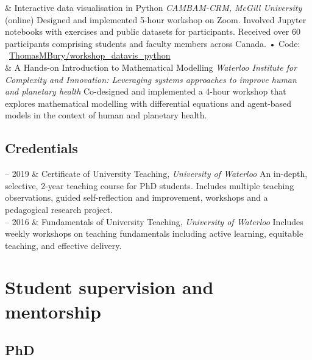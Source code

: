 \documentclass[11pt, a4paper]{article}
\newcommand{\GitHub}[1]{\newline • Code: \faGithub\ \href{https://github.com/#1}{#1}}
\newcommand{\Duration}[2]{\fontsize{10pt}{0}\selectfont #1 -- #2}
\newcommand{\Year}[1]{\fontsize{10pt}{0}\selectfont #1}
\begin{document}
\begin{EntriesTable}
\Year{2020} &
  Interactive data visualisation in Python\newline
  \textit{CAMBAM-CRM, McGill University} (online) \newline
  Designed and implemented 5-hour workshop on Zoom. 
  Involved Jupyter notebooks with exercises and public datasets for participants. 
  Received over 60 participants comprising students and faculty members across Canada.
  \GitHub{ThomasMBury/workshop\_datavis\_python}
  \\
\Year{2018}  &
  A Hands-on Introduction to Mathematical Modelling\newline
  \textit{Waterloo Institute for Complexity and Innovation: Leveraging systems approaches to improve human and planetary health}\newline
  Co-designed and implemented a 4-hour workshop that explores mathematical modelling with differential equations and agent-based models in the context of human and planetary health.
\end{EntriesTable}


\subsection{Credentials}

\begin{EntriesTable}
\Duration{2017}{2019} &
  Certificate of University Teaching, \textit{University of Waterloo}\newline
  An in-depth, selective, 2-year teaching course for PhD students. 
  Includes multiple teaching observations, guided self-reflection and improvement, workshops and a pedagogical research project.
  \\
\Duration{2015}{2016}  &
  Fundamentals of University Teaching, \textit{University of Waterloo}\newline
  Includes weekly workshops on teaching fundamentals including active learning, equitable teaching, and effective delivery.
\end{EntriesTable}



\section{Student supervision and mentorship}

\subsection{P\lowercase{h}D}
\end{document}
